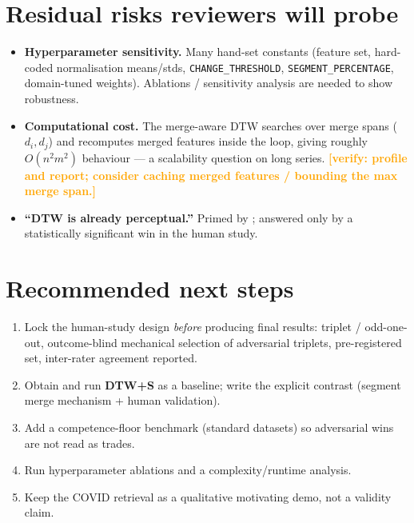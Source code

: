 \documentclass[11pt]{article}
\newcommand{\verify}[1]{\textcolor{orange}{\textbf{[verify: #1]}}}
\begin{document}
\section{Residual risks reviewers will probe}
\begin{itemize}[leftmargin=*]
  \item \textbf{Hyperparameter sensitivity.} Many hand-set constants (feature set,
  hard-coded normalisation means/stds, \texttt{CHANGE\_THRESHOLD}, \texttt{SEGMENT\_PERCENTAGE},
  domain-tuned weights). Ablations / sensitivity analysis are needed to show robustness.
  \item \textbf{Computational cost.} The merge-aware DTW searches over merge spans
  ($d_i, d_j$) and recomputes merged features inside the loop, giving roughly
  $O(n^2 m^2)$ behaviour --- a scalability question on long series. \verify{profile and
  report; consider caching merged features / bounding the max merge span.}
  \item \textbf{``DTW is already perceptual.''} Primed by \cite{gogolou2019}; answered only
  by a statistically significant win in the human study.
\end{itemize}

\section{Recommended next steps}
\begin{enumerate}[leftmargin=*]
  \item Lock the human-study design \emph{before} producing final results: triplet /
  odd-one-out, outcome-blind mechanical selection of adversarial triplets, pre-registered
  set, inter-rater agreement reported.
  \item Obtain and run \textbf{DTW+S} as a baseline; write the explicit contrast (segment
  merge mechanism + human validation).
  \item Add a competence-floor benchmark (standard datasets) so adversarial wins are not
  read as trades.
  \item Run hyperparameter ablations and a complexity/runtime analysis.
  \item Keep the COVID retrieval as a qualitative motivating demo, not a validity claim.
\end{enumerate}
\end{document}

